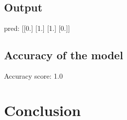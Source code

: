 \subsection{Output}
pred:  [[0.]
 [1.]
 [1.]
 [0.]]
\subsection{Accuracy of the model}
Accuracy score: 1.0


\section{Conclusion}






